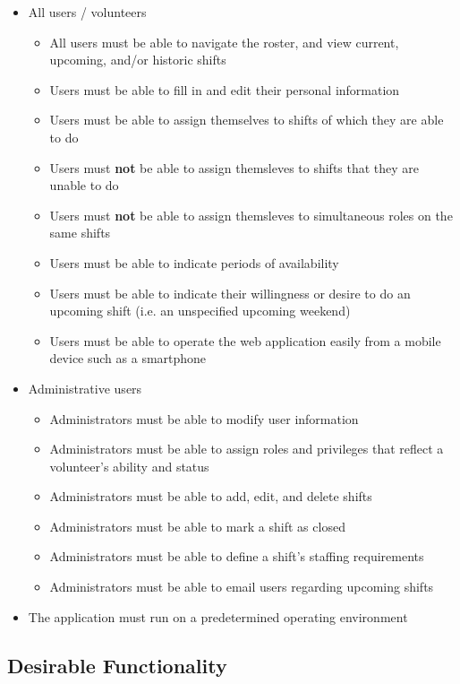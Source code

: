 \begin{itemize}
    \item All users / volunteers
    \begin{itemize}
        \item All users must be able to navigate the roster, and view current, upcoming, and/or historic shifts
        \item Users must be able to fill in and edit their personal information
        \item Users must be able to assign themselves to shifts of which they are able to do
        \item Users must \textbf{not} be able to assign themsleves to shifts that they are unable to do
        \item Users must \textbf{not} be able to assign themsleves to simultaneous roles on the same shifts
        \item Users must be able to indicate periods of availability
        \item Users must be able to indicate their willingness or desire to do an upcoming shift (i.e. an unspecified upcoming weekend)
        \item Users must be able to operate the web application easily from a mobile device such as a smartphone
    \end{itemize}
    \item Administrative users
    \begin{itemize}
        \item Administrators must be able to modify user information
        \item Administrators must be able to assign roles and privileges that reflect a volunteer's ability and status
        \item Administrators must be able to add, edit, and delete shifts
        \item Administrators must be able to mark a shift as closed
        \item Administrators must be able to define a shift's staffing requirements
        \item Administrators must be able to email users regarding upcoming shifts
    \end{itemize} 
    \item The application must run on a predetermined operating environment
\end{itemize}

\subsection{Desirable Functionality}
